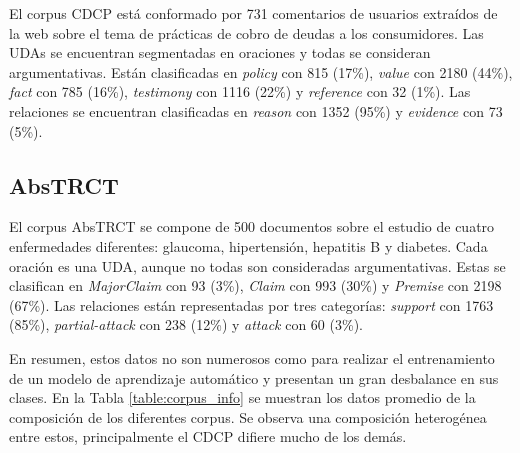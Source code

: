 \documentclass[a4paper,11pt,twocolumn,twoside]{article}
\begin{document}
El corpus CDCP \cite{niculae2017argument} está conformado por 731 comentarios de usuarios extraídos de la web sobre el tema de 
prácticas de cobro de deudas a los consumidores.
Las UDAs se encuentran segmentadas en oraciones y todas se consideran argumentativas.
Están clasificadas en 
\textit{policy} con 815 (17\%), \textit{value} con 2180 (44\%), \textit{fact} con 
785 (16\%), \textit{testimony} con 1116 (22\%) y \textit{reference} con 32 (1\%). 
Las relaciones se encuentran clasificadas en \textit{reason} con 1352 (95\%) y \textit{evidence} con 73 (5\%).

\subsection{AbsTRCT}

El corpus AbsTRCT \cite{mayer2020transformer} se compone de 500 documentos sobre el estudio de cuatro enfermedades diferentes:
glaucoma, hipertensión, hepatitis B y diabetes. Cada oración es una UDA, aunque no todas son consideradas
argumentativas. Estas se clasifican en \textit{MajorClaim} con 93 (3\%), \textit{Claim} con 993 (30\%) y \textit{Premise} con 2198 (67\%).
Las relaciones están representadas por tres categorías: \textit{support} con 1763 (85\%), \textit{partial-attack} con 238 (12\%) y
\textit{attack} con 60 (3\%).

En resumen, estos datos no son numerosos como para realizar el entrenamiento de un modelo de aprendizaje automático
y presentan un gran desbalance en sus clases.
En la Tabla \ref{table:corpus_info} se muestran los datos promedio de la composición de los diferentes corpus. 
Se observa una composición heterogénea entre estos, principalmente el CDCP difiere mucho de los demás.
\end{document}
